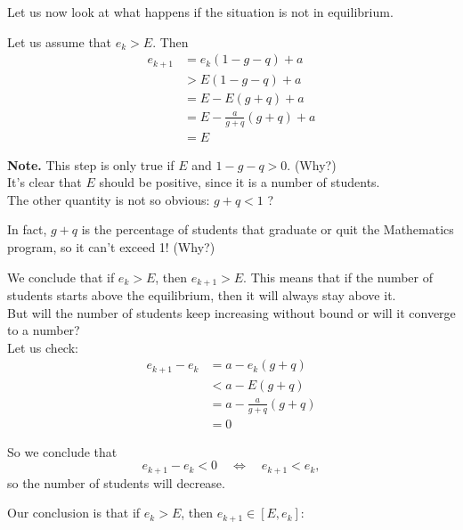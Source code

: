 Let us now look at what happens if the situation is not in equilibrium.

Let us assume that $e_k  > E$. Then
\begin{align*}
e_{k+1}
	& = e_k (1-g-q) + a \\
	& > E (1-g-q) + a \tag{see note below} \\
	& = E - E(g+q)+a \\
	& = E - \frac{a}{g+q}(g+q) + a\\
	& = E
\end{align*}

\begin{graybox}
\textbf{Note. } This step is only true if $E$ and $1-g-q>0$. (Why?) \\

It's clear that $E$ should be positive, since it is a number of students. \\

The other quantity is not so obvious: \quad $g+q < 1$ ?

In fact, $g+q$ is the percentage of students that graduate or quit the Mathematics program, so it can't exceed 1! (Why?)
\end{graybox}


We conclude that if $e_k > E$, then $e_{k+1}>E$. This means that if the number of students starts above the equilibrium, then it will always stay above it.\\

But will the number of students keep increasing without bound or will it converge to a number?\\

Let us check:
\begin{align*}
e_{k+1} - e_k
	& = a - e_k (g+q) \\
	& < a - E (g+q) \\
	& = a - \frac{a}{g+q} (g+q) \\
	& = 0
\end{align*}

So we conclude that 
$$
e_{k+1} - e_k < 0 \quad \Leftrightarrow \quad e_{k+1} < e_k,
$$
so the number of students will decrease.

Our conclusion is that if $e_k > E$, then $e_{k+1} \in [E, e_k]$:
\begin{center}
\end{center}


